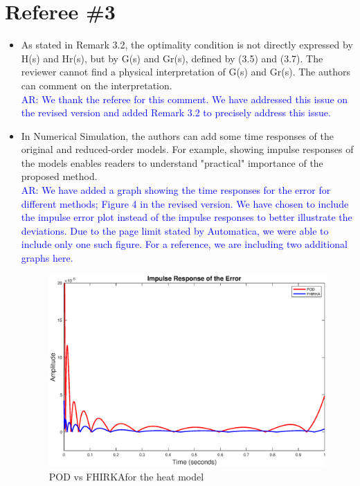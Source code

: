 \documentclass[11pt]{article}
\newcommand{\FH}{FHIRKA}
\def\serkan#1{\textcolor{blue}{{#1}}}
\begin{document}
\section*{Referee \#3}

\begin{itemize}
\item As stated in Remark 3.2, the optimality condition is not directly
expressed by H(s) and Hr(s), but by G(s) and Gr(s), defined by (3.5)
and (3.7).  The reviewer cannot find a physical interpretation of G(s)
and Gr(s).  The authors can comment on the interpretation.\\
\serkan{\textsf{AR}:  We thank the referee for this comment. We have addressed this issue on the revised version  and added Remark 3.2 to precisely address this issue.}

\item In Numerical Simulation, the authors can add some time responses of
the original and reduced-order models.	For example, showing impulse
responses of the models enables readers to understand "practical"
importance of the proposed method.\\
\serkan{\textsf{AR}:  We have added a graph showing the time responses for the error for different methods; Figure 4 in the revised version. We have chosen to include the impulse error plot instead of the impulse responses to better illustrate the deviations.  Due to the page limit stated by Automatica, we were able to include only one such figure. For a reference, we are including  two additional graphs here.}
 \begin{figure}[H]
 \centering
   \includegraphics [scale=0.5]{absHeatErrorYlim}
      \caption{POD vs \FH for the heat model\label{fig:impulseHeat}}

\end{figure}
\end{itemize}
\end{document}
